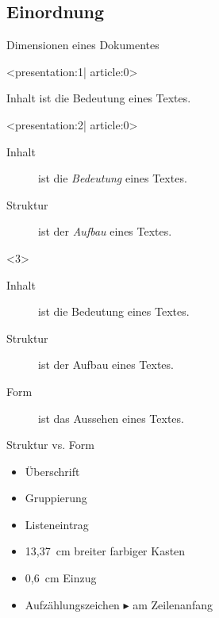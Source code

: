 
\subsection{Einordnung}

\begin{Frame}{Dimensionen eines Dokumentes}
  \begin{onlyenv}<presentation:1| article:0>
    \begin{center}
      Inhalt ist die Bedeutung eines Textes.
    \end{center}
  \end{onlyenv}
  \begin{onlyenv}<presentation:2| article:0>
    \begin{description}
      \item[\textnormal{\color{black}Inhalt}] ist die \emph{Bedeutung} eines Textes.
      \item[\textnormal{\color{black}Struktur}] ist der \emph{Aufbau} eines Textes.
    \end{description}
  \end{onlyenv}
  \begin{onlyenv}<3>
    \begin{description}
      \item[Inhalt] ist die \alert{Bedeutung} eines Textes.
      \item[Struktur] ist der \alert{Aufbau} eines Textes.
      \item[Form] ist das \alert{Aussehen} eines Textes.
    \end{description}
  \end{onlyenv}
\end{Frame}

\begin{Frame}{Struktur vs. Form}
  \begin{Beispiele}[Struktur]
    \begin{itemize}
      \item Überschrift
      \item Gruppierung
      \item Listeneintrag
    \end{itemize}
  \end{Beispiele}

  \xxx

  \begin{Beispiele}[Form]
    \begin{itemize}
      \item 13{,}37~cm breiter farbiger Kasten
      \item 0{,}6~cm Einzug
      \item Aufzählungszeichen $\blacktriangleright$ am Zeilenanfang
    \end{itemize}
  \end{Beispiele}
\end{Frame}


